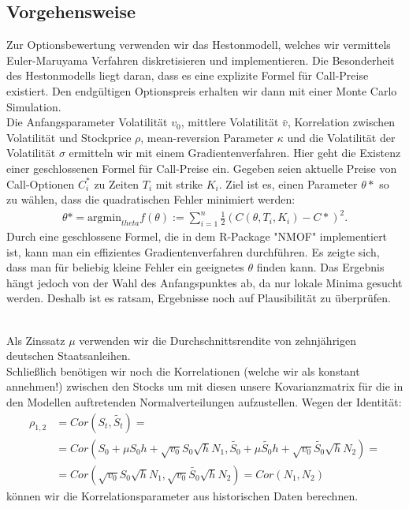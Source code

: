 \documentclass[a4paper,12pt]{article}
\numberwithin[\arabic]{Satz}{section}
\begin{document}
		\subsection*{Vorgehensweise}
		Zur Optionsbewertung verwenden wir das Hestonmodell, welches wir vermittels Euler-Maruyama Verfahren diskretisieren und implementieren. Die Besonderheit des Hestonmodells liegt daran, dass es eine explizite Formel für Call-Preise existiert. Den endgültigen Optionspreis erhalten wir dann mit einer Monte Carlo Simulation.\\
		Die Anfangsparameter Volatilität $v_0$, mittlere Volatilität $\bar{v}$, Korrelation zwischen Volatilität und Stockprice $\rho$, mean-reversion Parameter $\kappa$ und die Volatilität der Volatilität $\sigma$ ermitteln wir mit einem Gradientenverfahren. Hier geht die Existenz einer geschlossenen Formel für Call-Preise ein. Gegeben seien aktuelle Preise von Call-Optionen $C_i^*$ zu Zeiten $T_i$ mit strike $K_i$. Ziel ist es, einen Parameter $\theta*$ so zu wählen, dass die quadratischen Fehler minimiert werden:
		\begin{gather*}
		\theta*=\text{argmin}_{theta} f(\theta):=\sum_{i=1}^n \frac12 (C(\theta,T_i,K_i)-C*)^2.
		\end{gather*}
		Durch eine geschlossene Formel, die in dem R-Package "NMOF" implementiert ist, kann man ein effizientes Gradientenverfahren durchführen. Es zeigte sich, dass man für beliebig kleine Fehler ein geeignetes $\theta$ finden kann. Das Ergebnis hängt jedoch von der Wahl des Anfangspunktes ab, da nur lokale Minima gesucht werden. Deshalb ist es ratsam, Ergebnisse noch auf Plausibilität zu überprüfen.
		
		\\
		Als Zinssatz $\mu$ verwenden wir die Durchschnittsrendite von zehnjährigen deutschen Staatsanleihen.\\
		Schließlich benötigen wir noch die Korrelationen (welche wir als konstant annehmen!) zwischen den Stocks um mit diesen unsere Kovarianzmatrix für die in den Modellen auftretenden Normalverteilungen aufzustellen.
		Wegen der Identität:
		\begin{align*}
			\rho_{1,2}&=Cor(S_t,\tilde{S_t})=\\
			&=Cor(S_0+\mu S_0h+\sqrt{v_0}S_0\sqrt{h}N_1,\tilde{S_0}+\mu \tilde{S_0}h+\sqrt{v_0}\tilde{S_0}\sqrt{h}N_2)= \\
			&=Cor(\sqrt{v_0}S_0\sqrt{h}N_1,\sqrt{v_0}\tilde{S_0}\sqrt{h}N_2)=Cor(N_1,N_2)
		\end{align*}
		können wir die Korrelationsparameter aus historischen Daten berechnen.
		\newpage
\end{document}
